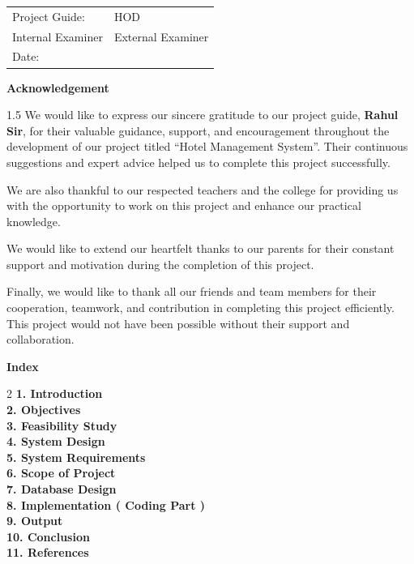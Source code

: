 \documentclass[12pt,a4paper]{article}
\begin{document}
\vspace{3cm}
\noindent
\begin{tabular}{@{}p{}p{}@{}}
Project Guide: & HOD \\[2.5cm]
Internal Examiner & External Examiner \\[2.5cm]
Date: & \\
\end{tabular}

\newpage
\begin{center}
{\Large \textbf{Acknowledgement}}
\end{center}
\vspace{1cm}
\begin{spacing}{1.5}
\noindent We would like to express our sincere gratitude to our project guide, \textbf{Rahul Sir}, for their valuable guidance, support, and encouragement throughout the development of our project titled ``Hotel Management System''. Their continuous suggestions and expert advice helped us to complete this project successfully.

\vspace{0.5cm}
\noindent We are also thankful to our respected teachers and the college for providing us with the opportunity to work on this project and enhance our practical knowledge.

\vspace{0.5cm}
\noindent We would like to extend our heartfelt thanks to our parents for their constant support and motivation during the completion of this project.

\vspace{0.5cm}
\noindent Finally, we would like to thank all our friends and team members for their cooperation, teamwork, and contribution in completing this project efficiently. This project would not have been possible without their support and collaboration.
\end{spacing}

\newpage
\begin{center}
{\Large \textbf{Index}}
\end{center}
\vspace{1cm}

\begin{spacing}{2}
\noindent
\textbf{1. Introduction} \\
\textbf{2. Objectives} \\
\textbf{3. Feasibility Study} \\
\textbf{4. System Design} \\
\textbf{5. System Requirements} \\
\textbf{6. Scope of Project} \\
\textbf{7. Database Design} \\
\textbf{8. Implementation ( Coding Part )} \\
\textbf{9. Output} \\
\textbf{10. Conclusion} \\
\textbf{11. References}
\end{spacing}
\end{document}
